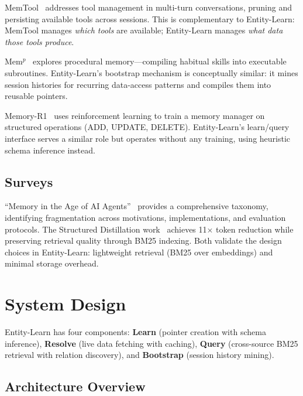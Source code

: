 \documentclass[11pt,twocolumn]{article}
\begin{document}
MemTool~\cite{memtool2025} addresses tool management in multi-turn conversations, pruning and persisting available tools across sessions.
This is complementary to Entity-Learn: MemTool manages \emph{which tools} are available; Entity-Learn manages \emph{what data those tools produce}.

Mem$^p$~\cite{memp2025} explores procedural memory---compiling habitual skills into executable subroutines.
Entity-Learn's bootstrap mechanism is conceptually similar: it mines session histories for recurring data-access patterns and compiles them into reusable pointers.

Memory-R1~\cite{memoryr1_2025} uses reinforcement learning to train a memory manager on structured operations (ADD, UPDATE, DELETE).
Entity-Learn's learn/query interface serves a similar role but operates without any training, using heuristic schema inference instead.

\subsection{Surveys}

``Memory in the Age of AI Agents''~\cite{memsurvey2025} provides a comprehensive taxonomy, identifying fragmentation across motivations, implementations, and evaluation protocols.
The Structured Distillation work~\cite{structdistill2026} achieves 11$\times$ token reduction while preserving retrieval quality through BM25 indexing.
Both validate the design choices in Entity-Learn: lightweight retrieval (BM25 over embeddings) and minimal storage overhead.


\section{System Design}
\label{sec:design}

Entity-Learn has four components: \textbf{Learn} (pointer creation with schema inference), \textbf{Resolve} (live data fetching with caching), \textbf{Query} (cross-source BM25 retrieval with relation discovery), and \textbf{Bootstrap} (session history mining).

\subsection{Architecture Overview}
\end{document}
